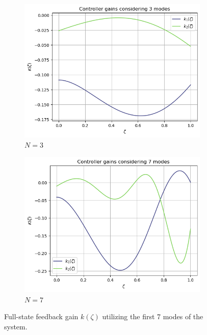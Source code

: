 \begin{figure}[ht]
    \centering
    \begin{subfigure}[b]{0.45\textwidth}
        \centering
        \includegraphics[width=\textwidth]{Figures/k_3.png}
        \caption{$N = 3$}
        \label{fig:k_3}
    \end{subfigure}
    \hfill
    \begin{subfigure}[b]{0.45\textwidth}
        \centering
        \includegraphics[width=\textwidth]{Figures/k_7.png}
        \caption{$N = 7$}
        \label{fig:k_7}
    \end{subfigure}
    \caption{Full-state feedback gain $k(\zeta)$ utilizing the first 7 modes of the system.}
    \label{fig:k_modes}
\end{figure}

